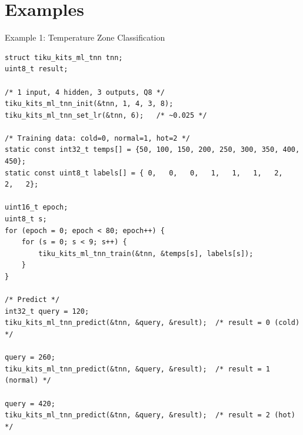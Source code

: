 \documentclass[aspectratio=169, 10pt]{beamer}
\begin{document}
\section{Examples}

\begin{frame}[fragile]{Example 1: Temperature Zone Classification}
\begin{lstlisting}[style=cstyle,
  title={examples/example\_ml\_tnn.c --- 1 input, 3 output classes}]
struct tiku_kits_ml_tnn tnn;
uint8_t result;

/* 1 input, 4 hidden, 3 outputs, Q8 */
tiku_kits_ml_tnn_init(&tnn, 1, 4, 3, 8);
tiku_kits_ml_tnn_set_lr(&tnn, 6);   /* ~0.025 */

/* Training data: cold=0, normal=1, hot=2 */
static const int32_t temps[] = {50, 100, 150, 200, 250, 300, 350, 400, 450};
static const uint8_t labels[] = { 0,   0,   0,   1,   1,   1,   2,   2,   2};

uint16_t epoch;
uint8_t s;
for (epoch = 0; epoch < 80; epoch++) {
    for (s = 0; s < 9; s++) {
        tiku_kits_ml_tnn_train(&tnn, &temps[s], labels[s]);
    }
}

/* Predict */
int32_t query = 120;
tiku_kits_ml_tnn_predict(&tnn, &query, &result);  /* result = 0 (cold) */

query = 260;
tiku_kits_ml_tnn_predict(&tnn, &query, &result);  /* result = 1 (normal) */

query = 420;
tiku_kits_ml_tnn_predict(&tnn, &query, &result);  /* result = 2 (hot) */
\end{lstlisting}
\end{frame}
\end{document}
